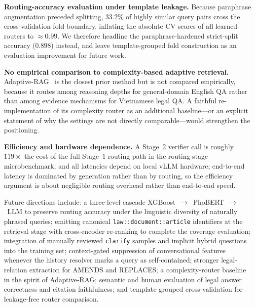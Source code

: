 \noindent\textbf{Routing-accuracy evaluation under template leakage.} Because
paraphrase augmentation preceded splitting, $33.2\%$ of highly similar query
pairs cross the cross-validation fold boundary, inflating the absolute CV
scores of all learned routers to $\approx 0.99$. We therefore headline the
paraphrase-hardened strict-split accuracy ($0.898$) instead, and leave
template-grouped fold construction as an evaluation improvement for future
work.

\noindent\textbf{No empirical comparison to complexity-based adaptive
retrieval.} Adaptive-RAG~\cite{jeong2024adaptive} is the closest prior method
but is not compared empirically, because it routes among reasoning depths for
general-domain English QA rather than among evidence mechanisms for Vietnamese
legal QA. A faithful re-implementation of its complexity router as an
additional baseline---or an explicit statement of why the settings are not
directly comparable---would strengthen the positioning.

\noindent\textbf{Efficiency and hardware dependence.} A Stage~2 verifier call
is roughly $119\times$ the cost of the full Stage~1 routing path in the
routing-stage microbenchmark, and all latencies depend on local vLLM
hardware; end-to-end latency is dominated by generation rather than by
routing, so the efficiency argument is about negligible routing overhead
rather than end-to-end speed.

Future directions include: a three-level cascade
XGBoost~$\rightarrow$~PhoBERT~$\rightarrow$~LLM to preserve routing accuracy
under the linguistic diversity of naturally phrased queries; emitting
canonical \texttt{law::document::article} identifiers at the retrieval stage
with cross-encoder re-ranking to complete the coverage evaluation;
integration of manually reviewed \texttt{clarify} samples and implicit hybrid
questions into the training set; context-gated suppression of conversational
features whenever the history resolver marks a query as self-contained;
stronger legal-relation extraction for
\textsc{AMENDS} and \textsc{REPLACES}; a complexity-router baseline in the
spirit of Adaptive-RAG; semantic and human evaluation of legal answer
correctness and citation faithfulness; and template-grouped cross-validation
for leakage-free router comparison.
